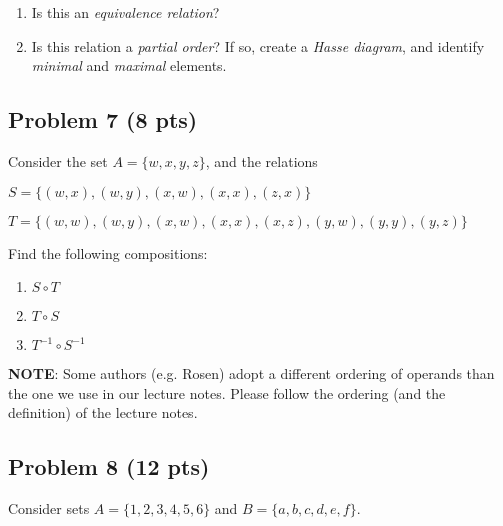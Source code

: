 \documentclass[12pt]{article}
\begin{document}
\begin{enumerate}

\item Is this an \textit{equivalence relation}?

\item Is this relation a \textit{partial order}? If so, create a \textit{Hasse diagram}, and identify \textit{minimal} and \textit{maximal} elements.

\end{enumerate}

\newpage

\subsection{Problem 7 (8 pts)}

Consider the set $A = \{ w, x, y, z \}$, and the relations

\begin{description}

\item $S = \{ (w, x), (w, y), (x, w), (x, x), (z, x) \}$

\item $T = \{ (w, w), (w, y), (x, w), (x, x),  (x, z), (y, w), (y, y), (y, z) \}$
\end{description}

\noindent Find the following compositions:

\begin{enumerate}
\item $S \circ T$

\item $T \circ S$

\item $T^{-1} \circ S^{-1}$
\end{enumerate}

\noindent \textbf{NOTE}: Some authors (e.g. Rosen) adopt a different ordering of operands than the one we use in our lecture notes. Please follow the ordering (and the definition) of the lecture notes.

\newpage


\subsection{Problem 8 (12 pts)}

Consider sets $A = \{1, 2, 3, 4, 5, 6 \}$ and $B = \{ a, b, c, d, e, f \}$.
\end{document}
